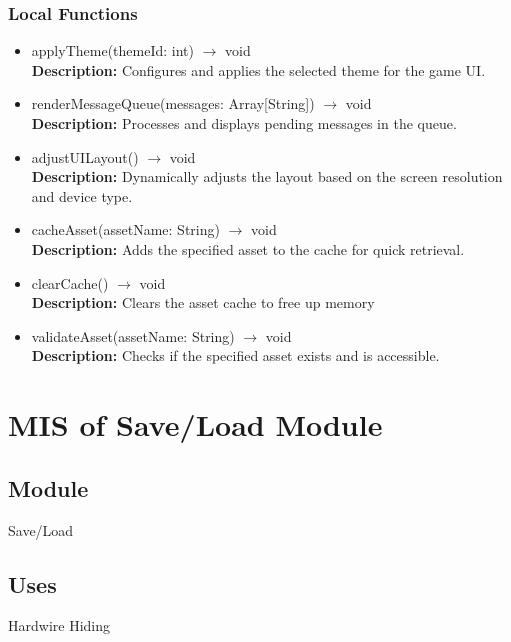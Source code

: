 \documentclass[12pt, titlepage]{article}
\begin{document}
\subsubsection{Local Functions}
\begin{itemize}
\item applyTheme(themeId: int) $\rightarrow$ void\\
\textbf{Description:} Configures and applies the selected theme for the game UI.

\item renderMessageQueue(messages: Array[String]) $\rightarrow$ void\\
\textbf{Description:} Processes and displays pending messages in the queue.

\item adjustUILayout() $\rightarrow$ void\\
\textbf{Description:} Dynamically adjusts the layout based on the screen resolution and device type.

\item cacheAsset(assetName: String) $\rightarrow$ void\\
\textbf{Description:} Adds the specified asset to the cache for quick retrieval.

\item clearCache() $\rightarrow$ void\\
\textbf{Description:} Clears the asset cache to free up memory

\item validateAsset(assetName: String) $\rightarrow$ void\\
\textbf{Description:} Checks if the specified asset exists and is accessible.

\end{itemize}





\section{MIS of Save/Load Module} 
\label{SLM}

\subsection{Module}
\hspace{1.5em}Save/Load

\subsection{Uses}
\hspace{1.5em}Hardwire Hiding
\end{document}
